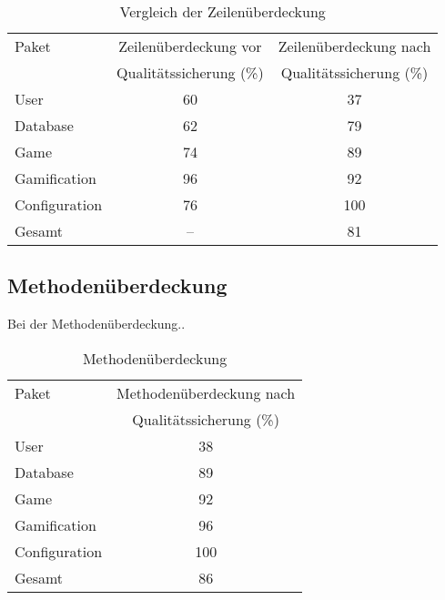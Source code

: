 \documentclass[a4paper]{scrreprt}
\begin{document}
    \vspace{20pt}
    \begin{table}[h]
        \begin{center}
        \begin{tabular}{ | l | c | c | }
            \hline
            Paket & Zeilenüberdeckung vor  & Zeilenüberdeckung nach \\
            & Qualitätssicherung (\%)  & Qualitätssicherung (\%) \\ \hline
            User & 60 & 37 \\
            Database & 62 & 79 \\
            Game & 74 & 89 \\
            Gamification & 96 & 92 \\
            Configuration & 76 & 100 \\
            Gesamt & -- & 81  \\
            \hline
        \end{tabular}
        \end{center}
        \caption{Vergleich der Zeilenüberdeckung}
    \end{table}%

    \newpage

    \subsection{Methodenüberdeckung}
    Bei der Methodenüberdeckung..

    \vspace{20pt}
    \begin{table}[h]
        \begin{center}
        \begin{tabular}{ | l | c | }
            \hline
            Paket & Methodenüberdeckung nach \\
            & Qualitätssicherung (\%) \\ \hline
            User & 38 \\
            Database & 89 \\
            Game & 92 \\
            Gamification & 96 \\
            Configuration & 100  \\
            Gesamt & 86  \\
            \hline
        \end{tabular}
        \end{center}
        \caption{Methodenüberdeckung}
    \end{table}%
\end{document}
